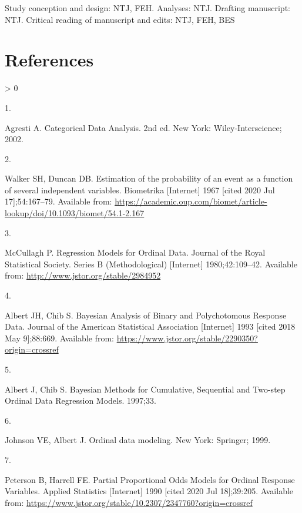 \documentclass[
]{article}
\newlength{\cslhangindent}
\newlength{\csllabelwidth}
\newenvironment{CSLReferences}[2] %
 {%
  \setlength{\parindent}{0pt}
  \ifodd #1 \everypar{\setlength{\hangindent}{\cslhangindent}}\ignorespaces\fi
  \ifnum #2 > 0
  \setlength{\parskip}{#2\baselineskip}
  \fi
 }%
 {}
\newcommand{\CSLLeftMargin}[1]{\parbox[t]{\csllabelwidth}{#1}}
\newcommand{\CSLRightInline}[1]{\parbox[t]{\linewidth - \csllabelwidth}{#1}\break}
\begin{document}
Study conception and design: NTJ, FEH. Analyses: NTJ. Drafting manuscript: NTJ. Critical reading of manuscript and edits: NTJ, FEH, BES

\newpage

\hypertarget{references}{%
\section*{References}\label{references}}

\hypertarget{refs}{}
\begin{CSLReferences}{0}{0}
\leavevmode\hypertarget{ref-agresti_categorical_2002}{}%
\CSLLeftMargin{1. }
\CSLRightInline{Agresti A. Categorical {Data} {Analysis}. 2nd ed. New York: Wiley-Interscience; 2002. }

\leavevmode\hypertarget{ref-walker_estimation_1967}{}%
\CSLLeftMargin{2. }
\CSLRightInline{Walker SH, Duncan DB. Estimation of the probability of an event as a function of several independent variables. Biometrika {[}Internet{]} 1967 {[}cited 2020 Jul 17{]};54:167--79. Available from: \url{https://academic.oup.com/biomet/article-lookup/doi/10.1093/biomet/54.1-2.167}}

\leavevmode\hypertarget{ref-peter_mccullagh_regression_1980}{}%
\CSLLeftMargin{3. }
\CSLRightInline{McCullagh P. Regression {Models} for {Ordinal} {Data}. Journal of the Royal Statistical Society. Series B (Methodological) {[}Internet{]} 1980;42:109--42. Available from: \url{http://www.jstor.org/stable/2984952}}

\leavevmode\hypertarget{ref-albert_bayesian_1993}{}%
\CSLLeftMargin{4. }
\CSLRightInline{Albert JH, Chib S. Bayesian {Analysis} of {Binary} and {Polychotomous} {Response} {Data}. Journal of the American Statistical Association {[}Internet{]} 1993 {[}cited 2018 May 9{]};88:669. Available from: \url{https://www.jstor.org/stable/2290350?origin=crossref}}

\leavevmode\hypertarget{ref-albert_bayesian_1997}{}%
\CSLLeftMargin{5. }
\CSLRightInline{Albert J, Chib S. Bayesian {Methods} for {Cumulative}, {Sequential} and {Two}-step {Ordinal} {Data} {Regression} {Models}. 1997;33. }

\leavevmode\hypertarget{ref-johnson_ordinal_1999}{}%
\CSLLeftMargin{6. }
\CSLRightInline{Johnson VE, Albert J. Ordinal data modeling. New York: Springer; 1999. }

\leavevmode\hypertarget{ref-peterson_partial_1990}{}%
\CSLLeftMargin{7. }
\CSLRightInline{Peterson B, Harrell FE. Partial {Proportional} {Odds} {Models} for {Ordinal} {Response} {Variables}. Applied Statistics {[}Internet{]} 1990 {[}cited 2020 Jul 18{]};39:205. Available from: \url{https://www.jstor.org/stable/10.2307/2347760?origin=crossref}}


\end{CSLReferences}
\end{document}
